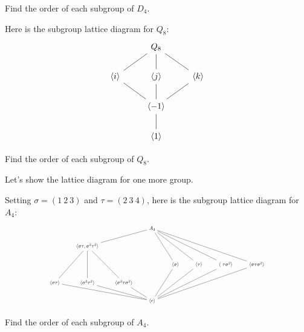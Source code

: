 \documentclass{ximera}
\begin{document}
\begin{exercise}
  Find the order of each subgroup of $D_4$.
\end{exercise}



\begin{example}
  Here is the subgroup lattice diagram for $Q_8$:
  \[
  \begin{tikzcd}
    & Q_8 \ar[rd,-] \ar[d,-] \ar[ld,-] &       \\
    \<i\>  \ar[rd,-] & \<j\>  \ar[d,-]     & \<k\> \ar[ld,-]\\
    &\< -1\> \ar[d,-]&        \\   
    & \<1\> &
  \end{tikzcd}
  \]
\end{example}


\begin{exercise}
  Find the order of each subgroup of $Q_8$.
\end{exercise}


Let's show the lattice diagram for one more group.

\begin{example}
  Setting $\sigma = (1 \ 2 \ 3)$ and $\tau = (2 \ 3 \ 4)$, here is the
  subgroup lattice diagram for $A_4$:
  \[
  \begin{tikzpicture}
  \node[scale=.6] at (0,0) {\begin{tikzcd}
                   &   & & A_4   \ar[lld,-] \ar[rdd,-] \ar[rrdd,-]  \ar[rrrdd,-]  \ar[rrrrdd,-]   & &  & &        \\
                   & \<\sigma\tau, \sigma^2\tau^2\> \ar[ldd,-] \ar[dd,-] \ar[rdd,-] &  &              & &  & &  \\
                   &                                  &            &   & \<\sigma\> \ar[ldd,-]& \<\tau\> \ar[lldd,-] & \<\ \tau\sigma^2\> \ar[llldd,-]& \< \sigma \tau\sigma^2 \>\ar[lllldd,-]       \\
   \<\sigma\tau\>\ar[drrr,-]  & \<\sigma^2\tau^2\> \ar[drr,-] & \<\sigma^2\tau\sigma^2\> \ar[dr,-]& & &  & &    \\
                   &                               &   & \< e\>       & & & &  
  \end{tikzcd}};
  \end{tikzpicture}
  \]
\end{example}


\begin{exercise}
  Find the order of each subgroup of $A_4$.
\end{exercise}
\end{document}
